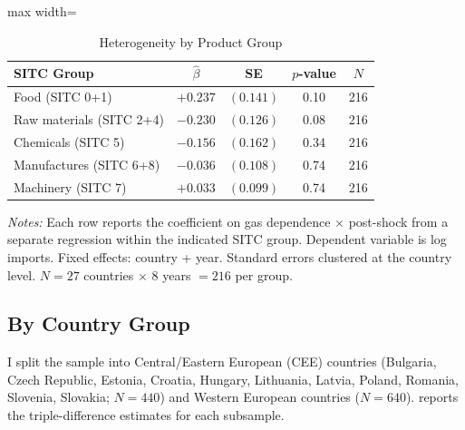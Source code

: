 \documentclass[12pt]{article}
\begin{document}
\begin{table}[htbp]
\centering
\caption{Heterogeneity by Product Group}
\label{tab:het_product}
\begin{adjustbox}{max width=\textwidth}
\begin{tabular}{lcccc}
\hline\hline
SITC Group & $\hat{\beta}$ & SE & $p$-value & $N$ \\
\hline
Food (SITC 0+1) & $+0.237$ & $(0.141)$ & 0.10 & 216 \\
Raw materials (SITC 2+4) & $-0.230$ & $(0.126)$ & 0.08 & 216 \\
Chemicals (SITC 5) & $-0.156$ & $(0.162)$ & 0.34 & 216 \\
Manufactures (SITC 6+8) & $-0.036$ & $(0.108)$ & 0.74 & 216 \\
Machinery (SITC 7) & $+0.033$ & $(0.099)$ & 0.74 & 216 \\
\hline\hline
\end{tabular}
\end{adjustbox}
\begin{minipage}{0.95\textwidth}
\vspace{0.3em}
\textit{Notes:} Each row reports the coefficient on gas dependence $\times$ post-shock from a separate regression within the indicated SITC group. Dependent variable is log imports. Fixed effects: country + year. Standard errors clustered at the country level. $N = 27$ countries $\times$ $8$ years $= 216$ per group.
\end{minipage}
\end{table}

\subsection{By Country Group}

I split the sample into Central/Eastern European (CEE) countries (Bulgaria, Czech Republic, Estonia, Croatia, Hungary, Lithuania, Latvia, Poland, Romania, Slovenia, Slovakia; $N = 440$) and Western European countries ($N = 640$).  reports the triple-difference estimates for each subsample.
\end{document}
